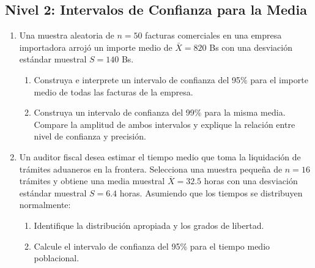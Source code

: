 \subsection*{Nivel 2: Intervalos de Confianza para la Media}
\begin{enumerate}[resume]
    \item Una muestra aleatoria de $n = 50$ facturas comerciales en una empresa importadora arrojó un importe medio de $\bar{X} = 820$ Bs con una desviación estándar muestral $S = 140$ Bs.
    \begin{enumerate}[label=\alph*)]
        \item Construya e interprete un intervalo de confianza del 95\% para el importe medio de todas las facturas de la empresa.
        \item Construya un intervalo de confianza del 99\% para la misma media. Compare la amplitud de ambos intervalos y explique la relación entre nivel de confianza y precisión.
    \end{enumerate}
    \item Un auditor fiscal desea estimar el tiempo medio que toma la liquidación de trámites aduaneros en la frontera. Selecciona una muestra pequeña de $n = 16$ trámites y obtiene una media muestral $\bar{X} = 32.5$ horas con una desviación estándar muestral $S = 6.4$ horas. Asumiendo que los tiempos se distribuyen normalmente:
    \begin{enumerate}[label=\alph*)]
        \item Identifique la distribución apropiada y los grados de libertad.
        \item Calcule el intervalo de confianza del 95\% para el tiempo medio poblacional.
    \end{enumerate}
\end{enumerate}

